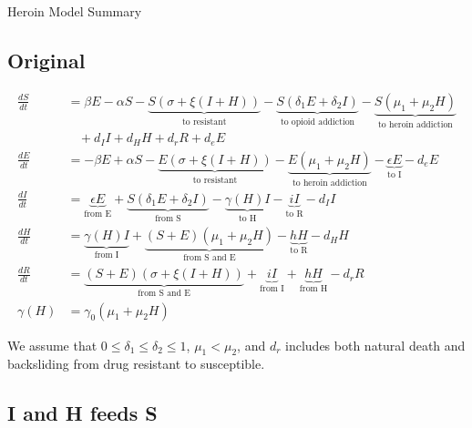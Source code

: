 \documentclass[11pt]{report}
\begin{document}
\begin{center}
{\Huge Heroin Model Summary}\\	
\end{center}
\vspace{1in}

\subsection*{Original}

\begin{align*}
	\frac{dS}{dt} &= \beta E - \alpha S - \underbrace{S(\sigma + \xi(I+H))}_{\text{to resistant}} - \underbrace{S(\delta_1 E + \delta_2 I)}_{\text{to opioid addiction}} - \underbrace{S(\mu_1+\mu_2H)}_{\text{to heroin addiction}}\\
	&\ \ \ \ + d_I I + d_H H + d_r R + d_e E\\
	\frac{dE}{dt} &= - \beta E + \alpha S - \underbrace{E(\sigma + \xi(I+H))}_{\text{to resistant}} - \underbrace{E(\mu_1 + \mu_2H)}_{\text{to heroin addiction}} - \underbrace{\epsilon E}_{\text{to I}} - d_e E\\
	\frac{dI}{dt} &= \underbrace{\epsilon E}_{\text{from E}} + \underbrace{S(\delta_1E+\delta_2I)}_{\text{from S}} - \underbrace{\gamma(H)I}_{\text{to H}} - \underbrace{iI}_{\text{to R}} - d_II\\
	\frac{dH}{dt} &= \underbrace{\gamma(H)I}_{\text{from I}} + \underbrace{(S+E)(\mu_1+\mu_2H)}_{\text{from S and E}} - \underbrace{hH}_{\text{to R}} - d_HH\\
	\frac{dR}{dt} &= \underbrace{(S+E)(\sigma + \xi(I+H))}_{\text{from S and E}} + \underbrace{iI}_{\text{from I}} + \underbrace{hH}_{\text{from H}} -d_rR\\
	\gamma(H) &= \gamma_0(\mu_1+\mu_2H)
\end{align*}

We assume that $0\leq\delta_1\leq\delta_2\leq 1$, $\mu_1<\mu_2$, and $d_r$ includes both natural death and backsliding from drug resistant to susceptible.

\subsection*{I and H feeds S}
\end{document}
